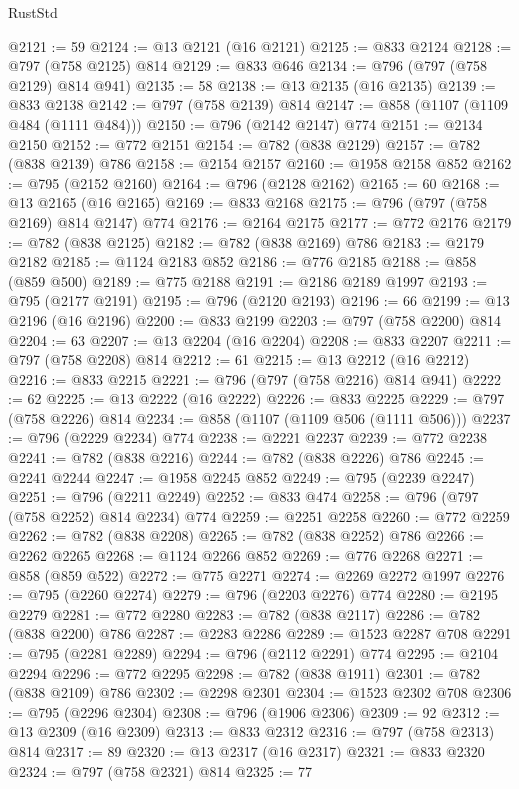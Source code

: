 \begin{lexlean}{RustStd}
\begin{coremodule}
@2121 := 59
@2124 := @13 @2121 (@16 @2121)
@2125 := @833 @2124
@2128 := @797 (@758 @2125) @814
@2129 := @833 @646
@2134 := @796 (@797 (@758 @2129) @814 @941)
@2135 := 58
@2138 := @13 @2135 (@16 @2135)
@2139 := @833 @2138
@2142 := @797 (@758 @2139) @814
@2147 := @858 (@1107 (@1109 @484 (@1111 @484)))
@2150 := @796 (@2142 @2147) @774
@2151 := @2134 @2150
@2152 := @772 @2151
@2154 := @782 (@838 @2129)
@2157 := @782 (@838 @2139) @786
@2158 := @2154 @2157
@2160 := @1958 @2158 @852
@2162 := @795 (@2152 @2160)
@2164 := @796 (@2128 @2162)
@2165 := 60
@2168 := @13 @2165 (@16 @2165)
@2169 := @833 @2168
@2175 := @796 (@797 (@758 @2169) @814 @2147) @774
@2176 := @2164 @2175
@2177 := @772 @2176
@2179 := @782 (@838 @2125)
@2182 := @782 (@838 @2169) @786
@2183 := @2179 @2182
@2185 := @1124 @2183 @852
@2186 := @776 @2185
@2188 := @858 (@859 @500)
@2189 := @775 @2188
@2191 := @2186 @2189 @1997
@2193 := @795 (@2177 @2191)
@2195 := @796 (@2120 @2193)
@2196 := 66
@2199 := @13 @2196 (@16 @2196)
@2200 := @833 @2199
@2203 := @797 (@758 @2200) @814
@2204 := 63
@2207 := @13 @2204 (@16 @2204)
@2208 := @833 @2207
@2211 := @797 (@758 @2208) @814
@2212 := 61
@2215 := @13 @2212 (@16 @2212)
@2216 := @833 @2215
@2221 := @796 (@797 (@758 @2216) @814 @941)
@2222 := 62
@2225 := @13 @2222 (@16 @2222)
@2226 := @833 @2225
@2229 := @797 (@758 @2226) @814
@2234 := @858 (@1107 (@1109 @506 (@1111 @506)))
@2237 := @796 (@2229 @2234) @774
@2238 := @2221 @2237
@2239 := @772 @2238
@2241 := @782 (@838 @2216)
@2244 := @782 (@838 @2226) @786
@2245 := @2241 @2244
@2247 := @1958 @2245 @852
@2249 := @795 (@2239 @2247)
@2251 := @796 (@2211 @2249)
@2252 := @833 @474
@2258 := @796 (@797 (@758 @2252) @814 @2234) @774
@2259 := @2251 @2258
@2260 := @772 @2259
@2262 := @782 (@838 @2208)
@2265 := @782 (@838 @2252) @786
@2266 := @2262 @2265
@2268 := @1124 @2266 @852
@2269 := @776 @2268
@2271 := @858 (@859 @522)
@2272 := @775 @2271
@2274 := @2269 @2272 @1997
@2276 := @795 (@2260 @2274)
@2279 := @796 (@2203 @2276) @774
@2280 := @2195 @2279
@2281 := @772 @2280
@2283 := @782 (@838 @2117)
@2286 := @782 (@838 @2200) @786
@2287 := @2283 @2286
@2289 := @1523 @2287 @708
@2291 := @795 (@2281 @2289)
@2294 := @796 (@2112 @2291) @774
@2295 := @2104 @2294
@2296 := @772 @2295
@2298 := @782 (@838 @1911)
@2301 := @782 (@838 @2109) @786
@2302 := @2298 @2301
@2304 := @1523 @2302 @708
@2306 := @795 (@2296 @2304)
@2308 := @796 (@1906 @2306)
@2309 := 92
@2312 := @13 @2309 (@16 @2309)
@2313 := @833 @2312
@2316 := @797 (@758 @2313) @814
@2317 := 89
@2320 := @13 @2317 (@16 @2317)
@2321 := @833 @2320
@2324 := @797 (@758 @2321) @814
@2325 := 77

\end{coremodule}
\end{lexlean}

